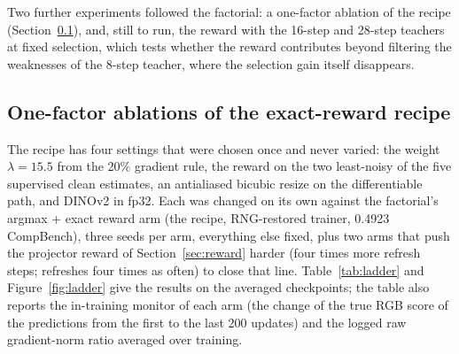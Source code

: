 \documentclass[11pt,a4paper]{article}
\begin{document}
Two further experiments followed the factorial: a one-factor ablation of the recipe (Section~\ref{sec:ladder}), and, still to run, the reward with the 16-step and 28-step teachers at fixed selection, which tests whether the reward contributes beyond filtering the weaknesses of the 8-step teacher, where the selection gain itself disappears.

\subsection{One-factor ablations of the exact-reward recipe}
\label{sec:ladder}
The recipe has four settings that were chosen once and never varied: the weight $\lambda=15.5$ from the 20\% gradient rule, the reward on the two least-noisy of the five supervised clean estimates, an antialiased bicubic resize on the differentiable path, and DINOv2 in fp32. Each was changed on its own against the factorial's argmax + exact reward arm (the recipe, RNG-restored trainer, 0.4923 CompBench), three seeds per arm, everything else fixed, plus two arms that push the projector reward of Section~\ref{sec:reward} harder (four times more refresh steps; refreshes four times as often) to close that line. Table~\ref{tab:ladder} and Figure~\ref{fig:ladder} give the results on the averaged checkpoints; the table also reports the in-training monitor of each arm (the change of the true RGB score of the predictions from the first to the last 200 updates) and the logged raw gradient-norm ratio averaged over training.
\end{document}
